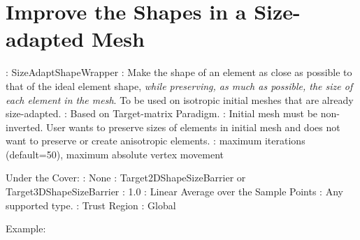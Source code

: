 \newpage

\section{Improve the Shapes in a Size-adapted Mesh} \label{sec:SizeAdaptShapeWrapper}

: SizeAdaptShapeWrapper \newline
{}: Make the shape of an element as close as possible to that
of the ideal element shape, {\it while preserving, as much as possible, the size of each element in the mesh}. To be used on isotropic initial meshes that are already size-adapted. \newline
{}: Based on Target-matrix Paradigm. \newline
{}: Initial mesh must be non-inverted. 
User wants to preserve sizes of elements in initial mesh and does not want to preserve or 
create anisotropic elements.  \newline 
{}: maximum iterations (default=50), maximum absolute vertex movement \newline \newline

\noindent Under the Cover: \newline
{}: None \newline
{}: Target2DShapeSizeBarrier or Target3DShapeSizeBarrier \newline
{}: 1.0 \newline
{}: Linear Average over the Sample Points \newline
{}: Any supported type. \newline
{}: Trust Region \newline
{}: Global \newline

\noindent Example: \newline

